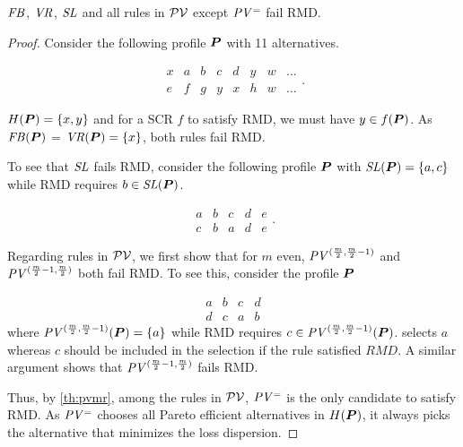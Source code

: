 \documentclass[version=3.21, pagesize, twoside=off, bibliography=totoc, DIV=calc, fontsize=12pt, a4paper]{scrartcl}
\begin{document}
\begin{theorem}
     $\mathit{FB}$, $\mathit{VR}$, $\mathit{SL}$ and all rules in $\mathcal{PV}$ except $\mathit{PV^=}$ fail RMD.
\end{theorem}
\begin{proof}
Consider the following profile $\bm{P}$ with 11 alternatives.

	\begin{equation}
		\begin{array}{llllllll}
			x&a&b&c&d&y&w&\ldots \\		e&f&g&y&x&h&w&\ldots
		\end{array}.
	\end{equation}

$H(\bm{P})=\{x, y\}$ and for a SCR $f$ to satisfy RMD, we must have $y\in   f(\bm{P})$. As $\mathit{FB}(\bm{P})$ = $\mathit{VR}(\bm{P})=\{x\}$, both rules fail RMD. 

To see that $\mathit{SL}$ fails RMD, consider the following profile $\bm{P}$ with $\mathit{SL}(\bm{P})=\{a, c\}$ while RMD requires $b \in \mathit{SL}(\bm{P})$. 

	\begin{equation}
		\begin{array}{lllll}
			a&b&c&d&e \\		c&b&a&d&e
		\end{array}.
	\end{equation}

Regarding rules in $\mathcal{PV}$, we first show that for $m$ even, $\PVv[(\frac{m}{2}, \frac{m}{2} - 1)]$ and $\PVv[(\frac{m}{2} - 1, \frac{m}{2})]$ both fail RMD. To see this, consider the profile $\bm{P}$

	\begin{equation}
		\begin{array}{llll}
			a&b&c&d \\		d&c&a&b
		\end{array}
	\end{equation}
where $\PVv[(\frac{m}{2}, \frac{m}{2} - 1)](\prof)=\{a\}$ while RMD requires $c \in \PVv[(\frac{m}{2}, \frac{m}{2} - 1)](\prof)$.  selects $a$ whereas $c$ should be included in the selection if the rule satisfied $RMD$. A similar argument shows that $\PVv[(\frac{m}{2} - 1, \frac{m}{2})]$ fails RMD.

Thus, by \cref{th:pvmr}, among the rules in $\mathcal{PV}$, $\mathit{PV^=}$ is the only candidate to satisfy RMD. As $\mathit{PV^=}$ chooses all Pareto efficient alternatives in $H(\bm{P})$, it always picks the alternative that minimizes the loss dispersion.
\end{proof}
\end{document}
